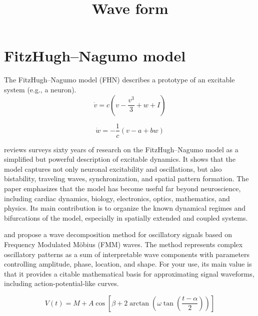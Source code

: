 \documentclass[a4paper]{article}
\title{Wave form}
\date{}
\begin{document}
    \maketitle
    
    
    \section{FitzHugh–Nagumo model}
        
        The FitzHugh–Nagumo model (FHN) describes a prototype of an excitable system (e.g., a neuron).
        \[
            \dot{v} = c\left(v - \frac{v^{3}}{3} + w + I\right)
        \]
        
        \[
            \dot{w} = -\frac{1}{c}\left(v - a + bw\right)
        \]
        
        \cite{cebrian-lacasa-2025-six-decades-of-the-fitzhugh-nagumo-model-a-guide-through-its-spatio-temporal-dynamics-and-influence-across-disciplines} reviews surveys sixty years of research on the FitzHugh–Nagumo model as a simplified but powerful description of excitable dynamics.
        It shows that the model captures not only neuronal excitability and oscillations, but also bistability, traveling waves, synchronization, and spatial pattern formation.
        The paper emphasizes that the model has become useful far beyond neuroscience, including cardiac dynamics, biology, electronics, optics, mathematics, and physics.
        Its main contribution is to organize the known dynamical regimes and bifurcations of the model, especially in spatially extended and coupled systems.
        
        \cite{rueda-2021-a-novel-wave-decomposition-for-oscillatory-signals} and \cite{rodriguez-collado-2021-identification-of-action-potential-waveforms} propose a wave decomposition method for oscillatory signals based on Frequency Modulated Möbius (FMM) waves. The method represents complex oscillatory patterns as a sum of interpretable wave components with parameters controlling amplitude, phase, location, and shape. For your use, its main value is that it provides a citable mathematical basis for approximating signal waveforms, including action-potential-like curves.
        
        \begin{equation}
            
            
            V(t)
            =
            M
            +
            A
            \cos\left[
                    \beta
                    +
                    2 \arctan\left(
                                 \omega
                                 \tan\left(\frac{t-\alpha}{2}\right)
                \right)
            \right]
        
        
        \end{equation}
        
\end{document}
